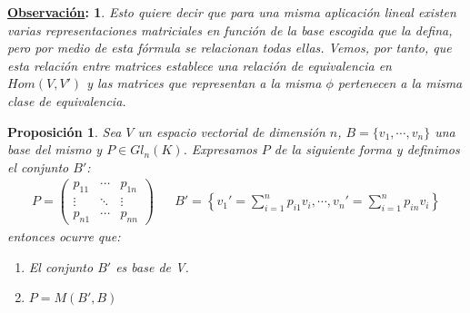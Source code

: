 \documentclass[10pt,a4paper,openright]{book}
\theoremstyle{break}
\newtheorem*{prop}{Proposición}
\newtheorem*{obs}{\underline{Observación}:}
\begin{document}
\begin{obs}
Esto quiere decir que para una misma aplicación lineal existen varias representaciones matriciales en función de la base escogida que la defina, pero por medio de esta fórmula se relacionan todas ellas. Vemos, por tanto, que esta relación entre matrices establece una relación de equivalencia en $Hom(V,V')$ y las matrices que representan a la misma $\phi$ pertenecen a la misma clase de equivalencia.
\end{obs}

\begin{prop}
Sea $V$ un espacio vectorial de dimensión $n$, $B = \{v_1, \cdots, v_n\}$ una base del mismo y $P\in Gl_n(K)$. Expresamos $P$ de la siguiente forma y definimos el conjunto $B'$:
\begin{align*}
P=\begin{pmatrix} p_{11} & \cdots & p_{1n} \\ \vdots & \ddots & \vdots \\ p_{n1} & \cdots & p_{nn}\end{pmatrix} & & B'=\left\lbrace v_1'=\sum_{i=1}^np_{i1}v_i, \cdots , v_n'=\sum_{i=1}^n p_{in}v_i\right\rbrace
\end{align*}
entonces ocurre que:
\begin{enumerate}
\item El conjunto $B'$ es base de V.

\item $P=M(B',B)$
\end{enumerate}
\end{prop}
\end{document}
